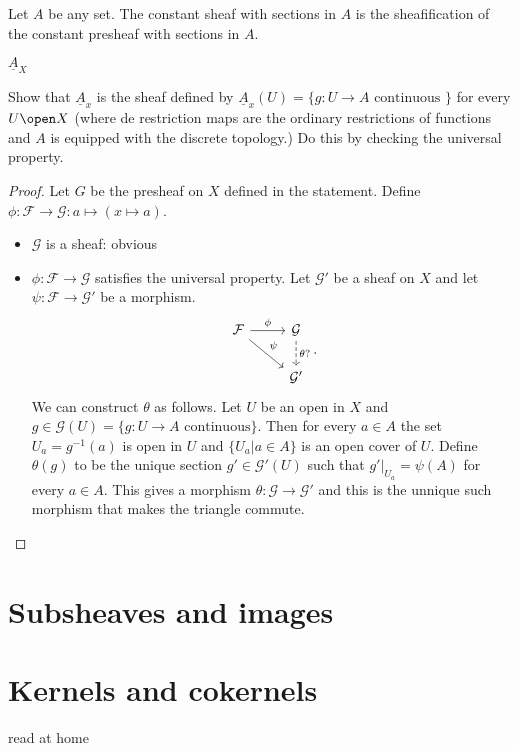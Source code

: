 \begin{example}
	Let $A$ be any set. The constant sheaf with sections in $A$ is the sheafification of the constant presheaf with sections in $A$. 
\end{example}
\begin{notation}
	$\underline{A}_X$
\end{notation}
\begin{exercise}
	Show that $\underline A_x$ is the sheaf defined by $\underline A_x(U) = \{g : U \to A \text{ continuous }\} $ for every $U \open X$ (where de restriction maps are the ordinary restrictions of functions and $A$ is equipped with the discrete topology.)
	Do this by checking the universal property.
\end{exercise}
\begin{proof}
	Let $G$ be the presheaf on $X$ defined in the statement. 
	Define $\phi: \mathcal{F}  \to \mathcal{G} : a \mapsto (x\mapsto a)$.
	\begin{itemize}
		\item $\mathcal{G} $ is a sheaf: obvious
		\item $\phi: \mathcal{F}  \to \mathcal{G} $ satisfies the universal property. Let $\mathcal{G} '$ be a sheaf on $X$ and let $\psi: \mathcal{F}  \to \mathcal{G} '$ be a morphism. \[ 
	\begin{tikzcd}
				\mathcal{F} \arrow[r, "\phi"] \arrow[dr, "\psi"] & \mathcal{G} \arrow[d, dashed,"\theta ?"]\\
							     & \mathcal{G} '
			\end{tikzcd}
		.\] 
		We can construct $\theta$ as follows. 
		Let $U$ be an open in $ X$ and $g \in \mathcal{G} (U) = \{g : U \to A \text{ continuous}\} $. 
		Then for every $a \in A$ the set $U_a = g^{-1}(a)$ is open in $U$ and  $\{U_a | a \in A\} $ is an open cover of $U$. Define $\theta(g)$ to be the unique section $g' \in \mathcal{G} '(U)$ such that $g'|_{U_a} = \psi(A)$ for every $a \in A$. This gives a morphism $\theta: \mathcal{G}  \to \mathcal{G} '$ 
		and this is the unnique such morphism that makes the triangle commute.
	\end{itemize}
\end{proof}

\section{Subsheaves and images} \label{sec:subsheaves_and_images}

\section{Kernels and cokernels} \label{sec:kernels_and_cokernels}
read at home

